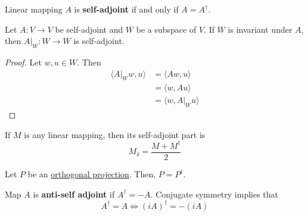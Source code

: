 	\begin{definition}
	  \label{def:self-adjoint-map}
    Linear mapping $A$ is \textbf{self-adjoint} if and only if $A = A^\dagger$. 
  \end{definition}

	\begin{theorem}
		\label{thm:restriction_self_adjoint}
	  Let $A: V \to V$ be self-adjoint and $W$ be a subspace of $V$. If $W$ is invariant under $A$, then $A|_W :W \to W$ is self-adjoint. 
	\end{theorem}
	\begin{proof}
		Let $w, u \in W$. Then
		\begin{align}
			\langle A|_W w, u \rangle & = \langle A w, u \rangle \\ 
																& = \langle w, A u \rangle \\ 
																& = \langle w, A|_W u \rangle 
		\end{align}
	\end{proof}

	If $M$ is any linear mapping, then its self-adjoint part is 
	\begin{equation}
		M_\delta = \frac{M + M^\dagger}{2}
	\end{equation}

	\begin{theorem}
	  \label{thm:orthogonal-projections-are-self-adjoint}
		Let $P$ be an \hyperref[def:orthogonal-projection]{orthogonal projection}. Then, $P = P^\dagger$. 
  \end{theorem}


  \begin{definition}
    \label{def:anti-self-adjoint}
    Map $A$ is \textbf{anti-self adjoint} if $A^\dagger = - A$. Conjugate symmetry implies that
    \begin{equation}
      A^\dagger = A \iff (i A)^\dagger = - (i A)
    \end{equation}
  \end{definition}

